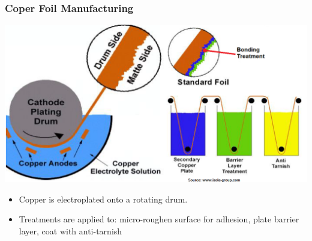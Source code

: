 \documentclass{beamer}
\begin{document}
	\begin{frame}
    \frametitle{Coper Foil Manufacturing}

		\begin{center}
			\includegraphics[scale=0.25]{obr24_Cu.png}
		\end{center}
		
		\begin{itemize}
			\item Copper is electroplated onto a rotating drum.
			\item Treatments are applied to: micro-roughen surface for adhesion, plate barrier layer, coat with anti-tarnish
		\end{itemize}
	\end{frame}
\end{document}
